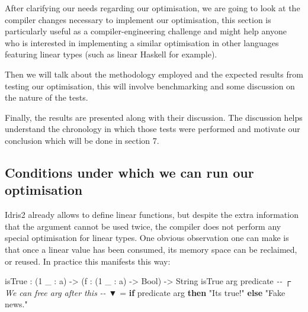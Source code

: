 \documentclass[
]{article}
\newenvironment{Shaded}{}{}
\newcommand{\CommentTok}[1]{\textcolor[rgb]{0.38,0.63,0.69}{\textit{#1}}}
\newcommand{\DataTypeTok}[1]{\textcolor[rgb]{0.56,0.13,0.00}{#1}}
\newcommand{\DecValTok}[1]{\textcolor[rgb]{0.25,0.63,0.44}{#1}}
\newcommand{\KeywordTok}[1]{\textcolor[rgb]{0.00,0.44,0.13}{\textbf{#1}}}
\newcommand{\NormalTok}[1]{#1}
\newcommand{\OperatorTok}[1]{\textcolor[rgb]{0.40,0.40,0.40}{#1}}
\newcommand{\OtherTok}[1]{\textcolor[rgb]{0.00,0.44,0.13}{#1}}
\newcommand{\StringTok}[1]{\textcolor[rgb]{0.25,0.44,0.63}{#1}}
\begin{document}
After clarifying our needs regarding our optimisation, we are going to
look at the compiler changes necessary to implement our optimisation,
this section is particularly useful as a compiler-engineering challenge
and might help anyone who is interested in implementing a similar
optimisation in other languages featuring linear types (such as linear
Haskell for example).

Then we will talk about the methodology employed and the expected
results from testing our optimisation, this will involve benchmarking
and some discussion on the nature of the tests.

Finally, the results are presented along with their discussion. The
discussion helps understand the chronology in which those tests were
performed and motivate our conclusion which will be done in section 7.

\hypertarget{conditions-under-which-we-can-run-our-optimisation}{%
\subsection{Conditions under which we can run our
optimisation}\label{conditions-under-which-we-can-run-our-optimisation}}

Idris2 already allows to define linear functions, but despite the extra
information that the argument cannot be used twice, the compiler does
not perform any special optimisation for linear types. One obvious
observation one can make is that once a linear value has been consumed,
its memory space can be reclaimed, or reused. In practice this manifests
this way:

\begin{Shaded}
\begin{Highlighting}[]
\NormalTok{isTrue }\OperatorTok{:}\NormalTok{ (}\DecValTok{1}\NormalTok{ \_ }\OperatorTok{:}\NormalTok{ a) }\OtherTok{{-}\textgreater{}}\NormalTok{ (f }\OperatorTok{:}\NormalTok{ (}\DecValTok{1}\NormalTok{ \_ }\OperatorTok{:}\NormalTok{ a) }\OtherTok{{-}\textgreater{}} \DataTypeTok{Bool}\NormalTok{) }\OtherTok{{-}\textgreater{}} \DataTypeTok{String}
\NormalTok{isTrue arg predicate}
\CommentTok{{-}{-}                ┌ We can free \textasciigrave{}arg\textasciigrave{} after this}
\CommentTok{{-}{-}                ▼}
  \OtherTok{=} \KeywordTok{if}\NormalTok{ predicate arg }\KeywordTok{then} \StringTok{"It\textquotesingle{}s true!"}
                     \KeywordTok{else} \StringTok{"Fake news."}
\end{Highlighting}
\end{Shaded}
\end{document}
